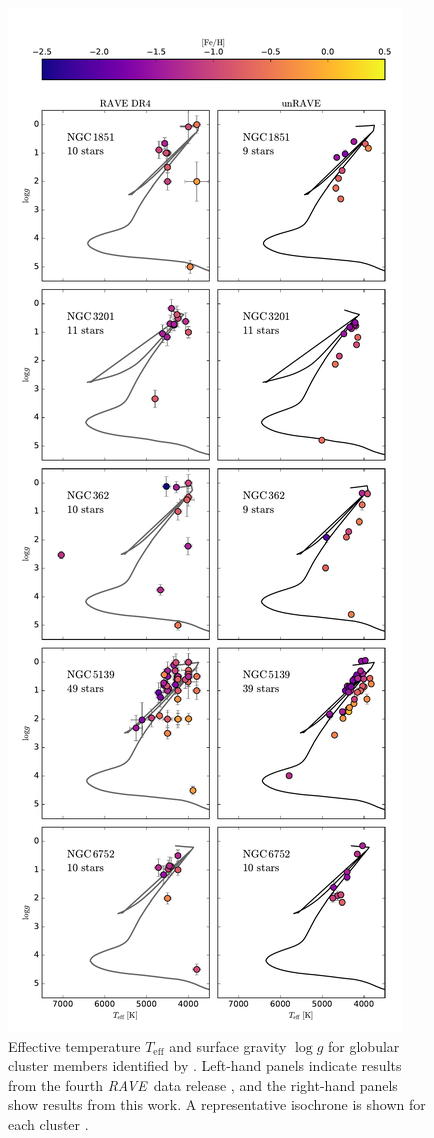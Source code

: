 \documentclass[preprint,trackchanges]{aastex}
\newcommand{\acronym}[1]{{\small{#1}}}
\newcommand{\project}[1]{\textsl{#1}}
\newcommand{\rave}{\project{\acronym{RAVE}}}
\newcommand{\teff}{T_{\mathrm{eff}}}
\newcommand{\logg}{\log g}
\begin{document}
\begin{figure}[p]
\center
\includegraphics[height=\textheight]{figures/globular-clusters.pdf}
\caption{Effective temperature $\teff$ and surface gravity $\logg$ for globular cluster members identified by \citet{Kunder_2014,Anguiano_2015}.  Left-hand panels indicate results from the fourth \rave\ data release \citep{Kordopatis_2013}, and the right-hand panels show results from this work. A representative isochrone is shown for each cluster \citep{Bressan_2012}.\label{fig:globular-cluster-HRD}}
\end{figure}
\end{document}
